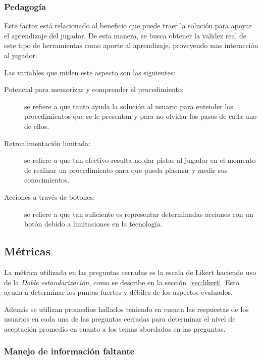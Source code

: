 \subsubsection{Pedagogía}
\label{sec:sub_pedagogia}

Este factor está relacionado al beneficio que puede traer la
solución para apoyar el aprendizaje del jugador. De esta manera, se busca
obtener la validez real de este tipo de herramientas como aporte al aprendizaje,
proveyendo mas interacción al jugador.

Las variables que miden este aspecto son las siguientes:

\begin{description}

\item[Potencial para memorizar y comprender el procedimiento:] se refiere a
    que tanto ayuda la solución al usuario para entender los procedimientos que se
    le presentan y para no olvidar los pasos de cada uno de ellos.

\item[Retroalimentación limitada:] se refiere a que tan efectivo
    resulta no dar pistas al jugador en el momento de realizar un procedimiento
    para que pueda plasmar y medir sus conocimientos.

\item[Acciones a través de botones:] se refiere a que tan
    suficiente es representar determinadas acciones  con un botón debido a
    limitaciones en la tecnología.

\end{description}


\subsection{Métricas}

La métrica utilizada en las preguntas cerradas es la escala de Likert haciendo
uso de la \emph{Doble estandarización}, como se describe en la
sección~\ref{sec:likert}. Esto ayuda a determinar los puntos fuertes y débiles
de los aspectos evaluados.

Además se utilizan promedios hallados teniendo en cuenta las respuestas de los
usuarios en cada una de las preguntas cerradas para determinar el nivel de
aceptación promedio en cuanto a los temas abordados en las preguntas.

\subsubsection{Manejo de información faltante}
\label{sec:informacion_faltante}

